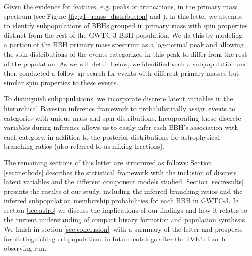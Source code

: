 Given the evidence for features, e.g. peaks or truncations, in the primary mass spectrum (see Figure \ref{fig:g1_mass_distribution} and \citet{2021arXiv211103634T, 2022ApJ...928..155T, 10.3847/2041-8213/aa9bf6, 10.3847/1538-4357/aab34c, 2019ApJ...882L..24A, 2021ApJ...913L...7A}), in this letter we attempt to identify subpopulations of BBHs grouped in primary mass with spin properties distinct from the rest of the GWTC-3 BBH population. We do this by modeling a portion of the BBH primary mass spectrum as a log-normal peak and allowing the spin distributions of the events categorized in this peak to differ from the rest of the population. As we will detail below, we identified such a subpopulation and then conducted a follow-up search for events with different primary masses but similar spin properties to these events.

To distinguish subpopulations, we incorporate discrete latent variables in the hierarchical Bayesian inference framework to probabilistically assign events to categories with unique mass and spin distributions. Incorporating these discrete variables during inference allows us to easily infer each BBH's association with each category, in addition to the posterior distributions for astrophysical branching ratios (also referred to as mixing fractions). 

The remaining sections of this letter are structured as follows: Section \ref{sec:methods} describes the statistical framework with the inclusion of discrete latent variables and the different component models studied. Section \ref{sec:results} presents the results of our study, including the inferred branching ratios and the inferred subpopulation membership probabilities for each BBH in GWTC-3. In section \ref{sec:astro} we discuss the implications of our findings and how it relates to the current understanding of compact binary formation and population synthesis. We finish in section \ref{sec:conclusion}, with a summary of the letter and prospects for distinguishing subpopulations in future catalogs after the LVK's fourth observing run.